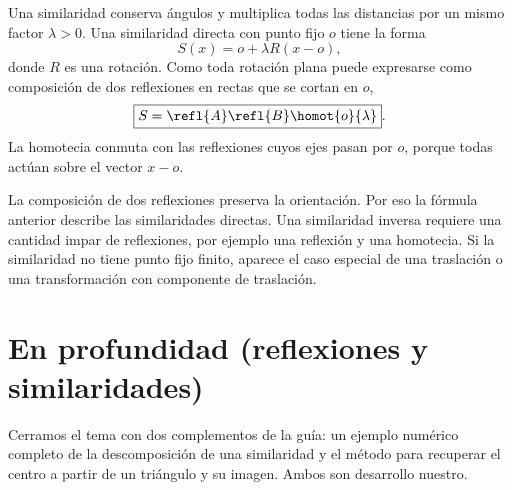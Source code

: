 Una similaridad conserva ángulos y multiplica todas las distancias por un mismo factor
\(\lambda>0\). Una similaridad directa con punto fijo \(o\) tiene la forma
\[
  S(x)=o+\lambda R(x-o),
\]
donde \(R\) es una rotación. Como toda rotación plana puede expresarse como composición de
dos reflexiones en rectas que se cortan en \(o\),
\[
  \boxed{S=\refl{A}\refl{B}\homot{o}{\lambda}}.
\]
La homotecia conmuta con las reflexiones cuyos ejes pasan por \(o\), porque todas actúan
sobre el vector \(x-o\).

\begin{center}
\end{center}

\begin{atencion}
La composición de dos reflexiones preserva la orientación. Por eso la fórmula anterior
describe las similaridades directas. Una similaridad inversa requiere una cantidad impar de
reflexiones, por ejemplo una reflexión y una homotecia. Si la similaridad no tiene punto fijo
finito, aparece el caso especial de una traslación o una transformación con componente de
traslación.
\end{atencion}

\section{En profundidad (reflexiones y similaridades)}

Cerramos el tema con dos complementos de la guía: un ejemplo numérico completo de la descomposición de una similaridad y el método para recuperar el centro a partir de un triángulo y su imagen. Ambos son desarrollo nuestro.

